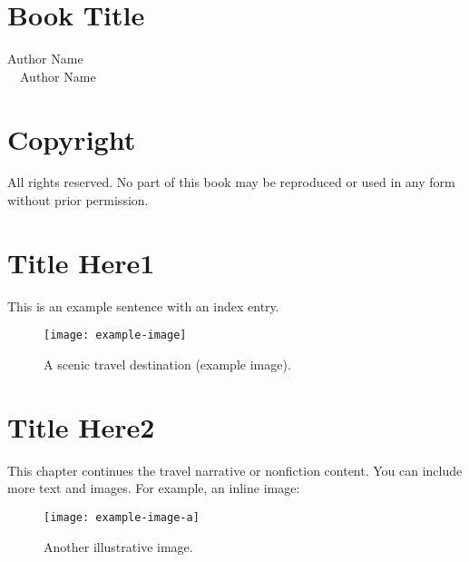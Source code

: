 \documentclass[10pt]{book}
\begin{document}
\frontmatter

\chapter*{\centering \Huge Book Title}
\thispagestyle{empty}   %
\vspace{1em}
\begin{center}
  {\Large Author Name}\\[1ex]
  {\normalsize \textcopyright\ \the\year\ Author Name}
\end{center}
\newpage

\chapter*{Copyright}
\noindent All rights reserved. No part of this book may be reproduced or used 
in any form without prior permission.
\newpage

\tableofcontents

\mainmatter

\chapter{Title Here1}
This is an example sentence with an index entry.


\lipsum[1]  %

\begin{figure}[htbp]
  \centering
  \texttt{[image: example-image]} %
  \caption{A scenic travel destination (example image).}
\end{figure}

\lipsum[1]  %

\lipsum[2]  %

\chapter{Title Here2}
This chapter continues the travel narrative or nonfiction content. You can include more text and images. For example, an inline image:
\begin{figure}[htbp]
  \centering
  \texttt{[image: example-image-a]} 
  \caption{Another illustrative image.}
\end{figure}
\end{document}
